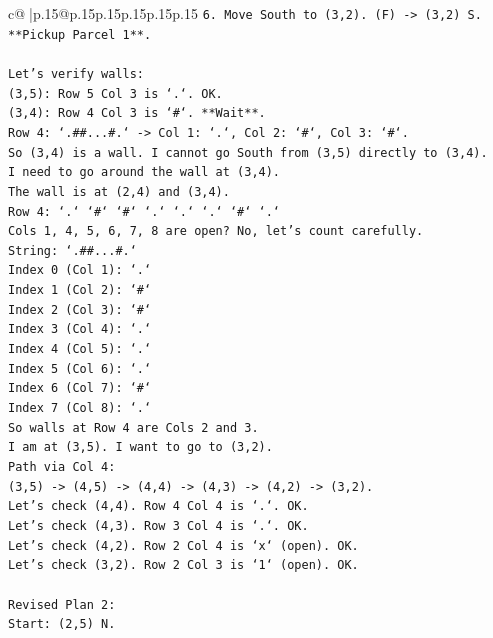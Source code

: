 \documentclass{article}
\begin{document}
{\begin{supertabular}{c@{$\;$}|p{.15\linewidth}@{}p{.15\linewidth}p{.15\linewidth}p{.15\linewidth}p{.15\linewidth}p{.15\linewidth}}
{{{\texttt{6. Move South to (3,2). (F) {-}> (3,2) S. **Pickup Parcel 1**.} \\
\\ 
\texttt{Let's verify walls:} \\
\texttt{(3,5): Row 5 Col 3 is `.`. OK.} \\
\texttt{(3,4): Row 4 Col 3 is `\#`. **Wait**.} \\
\texttt{Row 4: `.\#\#...\#.` {-}> Col 1: `.`, Col 2: `\#`, Col 3: `\#`.} \\
\texttt{So (3,4) is a wall. I cannot go South from (3,5) directly to (3,4).} \\
\texttt{I need to go around the wall at (3,4).} \\
\texttt{The wall is at (2,4) and (3,4).} \\
\texttt{Row 4: `.` `\#` `\#` `.` `.` `.` `\#` `.`} \\
\texttt{Cols 1, 4, 5, 6, 7, 8 are open? No, let's count carefully.} \\
\texttt{String: `.\#\#...\#.`} \\
\texttt{Index 0 (Col 1): `.`} \\
\texttt{Index 1 (Col 2): `\#`} \\
\texttt{Index 2 (Col 3): `\#`} \\
\texttt{Index 3 (Col 4): `.`} \\
\texttt{Index 4 (Col 5): `.`} \\
\texttt{Index 5 (Col 6): `.`} \\
\texttt{Index 6 (Col 7): `\#`} \\
\texttt{Index 7 (Col 8): `.`} \\
\texttt{So walls at Row 4 are Cols 2 and 3.} \\
\texttt{I am at (3,5). I want to go to (3,2).} \\
\texttt{Path via Col 4:} \\
\texttt{(3,5) {-}> (4,5) {-}> (4,4) {-}> (4,3) {-}> (4,2) {-}> (3,2).} \\
\texttt{Let's check (4,4). Row 4 Col 4 is `.`. OK.} \\
\texttt{Let's check (4,3). Row 3 Col 4 is `.`. OK.} \\
\texttt{Let's check (4,2). Row 2 Col 4 is `x` (open). OK.} \\
\texttt{Let's check (3,2). Row 2 Col 3 is `1` (open). OK.} \\
\\ 
\texttt{Revised Plan 2:} \\
\texttt{Start: (2,5) N.} \\
}}}
\end{supertabular}}
\end{document}
